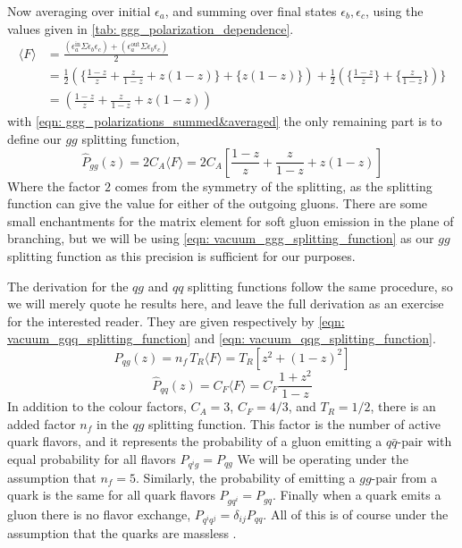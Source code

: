 \documentclass[main.tex]{subfiles}
\begin{document}
Now averaging over initial \(\epsilon_a\), and summing over final states \(\epsilon_b, \epsilon_c\), using the values given in \autoref{tab: ggg_polarization_dependence}.
\begin{align}\label{eqn: ggg_polarizations_summed&averaged}
    \langle F \rangle &= \frac{(\epsilon_a^{\text{in}} \Sigma \epsilon_b\epsilon_c ) + (\epsilon_a^{\text{out}} \Sigma \epsilon_b\epsilon_c)}{2} \nonumber\\
    &= \frac{1}{2} \left( \{ \frac{1-z}{z} + \frac{z}{1-z} + z(1-z) \} + \{ z(1-z) \} \right) + \frac{1}{2} \left( \{\frac{1-z}{z} \} + \{ \frac{z}{1-z} \}\right) \} \nonumber\\
    &= \left( \frac{1-z}{z} + \frac{z}{1-z} + z(1-z) \right)
\end{align}
with \autoref{eqn: ggg_polarizations_summed&averaged} the only remaining part is to define our \(gg\) splitting function,
\begin{equation}\label{eqn: vacuum_ggg_splitting_function}
    \hat P_{gg}(z) = 2C_A \langle F \rangle = 2 C_A \left[ \frac{1-z}{z} + \frac{z}{1-z} + z(1-z) \right]
\end{equation}
Where the factor \(2\) comes from the symmetry of the splitting, as the splitting function can give the value for either of the outgoing gluons.
There are some small enchantments for the matrix element for soft gluon emission in the plane of branching, but we will be using \autoref{eqn: vacuum_ggg_splitting_function} as our \(gg\) splitting function as this precision is sufficient for our purposes.

The derivation for the \(qg\) and \(qq\) splitting functions follow the same procedure, so we will merely quote he results here, and leave the full derivation as an exercise for the interested reader. They are given respectively by \autoref{eqn: vacuum_gqq_splitting_function} and \autoref{eqn: vacuum_qqg_splitting_function}.
\begin{equation}\label{eqn: vacuum_gqq_splitting_function}
    \hat P_{qg}(z) = n_f \, T_R \langle F \rangle = T_R \left[ z^2 + (1-z)^2 \right] 
\end{equation}
\begin{equation}\label{eqn: vacuum_qqg_splitting_function}
    \hat P_{qq} (z) = C_F \langle F \rangle = C_F \frac{1+z^2}{1-z}
\end{equation}
In addition to the colour factors, \(C_A = 3\), \(C_F=4/3\), and \(T_R=1/2\), there is an added factor \(n_f\) in the \(qg\) splitting function. This factor is the number of active quark flavors, and it represents the probability of a gluon emitting a \(q\bar q\text{-pair}\) with equal probability for all flavors \(P_{q^ig} = P_{qg}\) We will be operating under the assumption that \(n_f = 5\). Similarly, the probability of emitting a \(gg\text{-pair}\) from a quark is the same for all quark flavors \(P_{gq^i} = P_{gq}\). Finally when a quark emits a gluon there is no flavor exchange, \(P_{q^iq^j} = \delta_{ij} P_{qq}\). All of this is of course under the assumption that the quarks are massless \cite{AltarelliParisi_original}.
\end{document}

